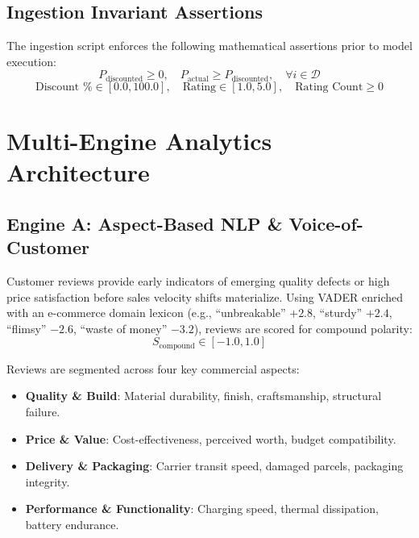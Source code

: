 \documentclass[11pt,a4paper]{article}
\begin{document}
\subsection{Ingestion Invariant Assertions}
The ingestion script enforces the following mathematical assertions prior to model execution:
\begin{equation}
    P_{\text{discounted}} \ge 0, \quad P_{\text{actual}} \ge P_{\text{discounted}}, \quad \forall i \in \mathcal{D}
\end{equation}
\begin{equation}
    \text{Discount \%} \in [0.0, 100.0], \quad \text{Rating} \in [1.0, 5.0], \quad \text{Rating Count} \ge 0
\end{equation}

\section{Multi-Engine Analytics Architecture}

\subsection{Engine A: Aspect-Based NLP \& Voice-of-Customer}
Customer reviews provide early indicators of emerging quality defects or high price satisfaction before sales velocity shifts materialize. Using VADER enriched with an e-commerce domain lexicon (e.g., ``unbreakable'' $+2.8$, ``sturdy'' $+2.4$, ``flimsy'' $-2.6$, ``waste of money'' $-3.2$), reviews are scored for compound polarity:
\begin{equation}
    S_{\text{compound}} \in [-1.0, 1.0]
\end{equation}

Reviews are segmented across four key commercial aspects:
\begin{itemize}[leftmargin=1.5em, itemsep=2pt]
    \item \textbf{Quality \& Build}: Material durability, finish, craftsmanship, structural failure.
    \item \textbf{Price \& Value}: Cost-effectiveness, perceived worth, budget compatibility.
    \item \textbf{Delivery \& Packaging}: Carrier transit speed, damaged parcels, packaging integrity.
    \item \textbf{Performance \& Functionality}: Charging speed, thermal dissipation, battery endurance.
\end{itemize}
\end{document}
